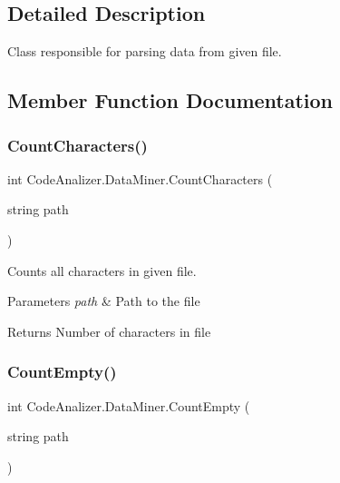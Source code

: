 \subsection{Detailed Description}
Class responsible for parsing data from given file. 



\subsection{Member Function Documentation}
\mbox{\label{class_code_analizer_1_1_data_miner_afdd5aa746928000245a570ee2af8ee52}} 
\subsubsection{\texorpdfstring{Count\+Characters()}{CountCharacters()}}
{\footnotesize\ttfamily int Code\+Analizer.\+Data\+Miner.\+Count\+Characters (\begin{DoxyParamCaption}\item[{string}]{path }\end{DoxyParamCaption})}



Counts all characters in given file. 


\begin{DoxyParams}{Parameters}
{\em path} & Path to the file\\
\hline
\end{DoxyParams}
\begin{DoxyReturn}{Returns}
Number of characters in file
\end{DoxyReturn}
\mbox{\label{class_code_analizer_1_1_data_miner_a5071efa31874229befaefa1ec5f4dfcb}} 
\subsubsection{\texorpdfstring{Count\+Empty()}{CountEmpty()}}
{\footnotesize\ttfamily int Code\+Analizer.\+Data\+Miner.\+Count\+Empty (\begin{DoxyParamCaption}\item[{string}]{path }\end{DoxyParamCaption})}



